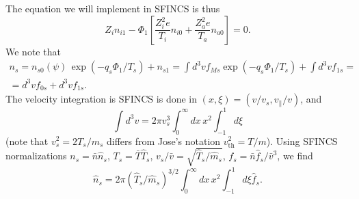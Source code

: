\documentclass[12pt]{article}
\newcommand{\remark}[1]{\textbf{\textcolor{red}{REMARK: #1}}}
\begin{document}
The equation we will implement in SFINCS is thus 
\begin{equation}
Z_i n_{i 1} - \Phi_1 \left[ \frac{Z_i^2 e}{T_i} n_{i 0} + \frac{Z_a^2 e}{T_a} n_{a 0}\right] = 0.
\label{eq:QuasineutralityIonElectrons}
\end{equation}
We note that
\begin{multline}
n_s = n_{s 0} \left(\psi\right) \, \exp \left(- q_s \Phi_1 / T_s \right) + n_{s 1} = \int d^3 v f_{Ms} \exp \left(- q_s \Phi_1 / T_s \right) + \int d^3 v f_{1 s} = \\ = 
d^3 v f_{0 s} + d^3 v f_{1 s}.
\label{eq:distributionToDensity}
\end{multline}
The velocity integration is SFINCS is done in $\left(x, \xi\right) = \left(v / v_s, v_\| / v\right)$, and 
\begin{equation}
\int d^3 v = 2 \pi v_{s}^3 \int_{0}^{\infty} dx\, x^2 \int_{-1}^{1} d\xi
\label{eq:VelocityIntegration2}
\end{equation}
(note that $v_{s}^2 = 2 T_s/m_s$ differs from Jose's notation $v_{\mathrm{th}}^2 = T/m$). 
Using SFINCS normalizations $n_s = \bar{n}  \hat{n}_s$, $T_s = \bar{T}  \hat{T}_s$, $v_s / \bar{v} = \sqrt{\hat{T}_s / \hat{m}_s}$, 
$f_s = \bar{n} \hat{f}_s / \bar{v}^3$, 
we find 
\begin{equation}
\hat{n}_s = 2 \pi \left(\hat{T}_s / \hat{m}_s\right)^{3/2} \int_{0}^{\infty} dx\, x^2 \int_{-1}^{1} d\xi \hat{f}_s.
\label{eq:VelocityIntegrationSFINCS}
\end{equation}
\end{document}
